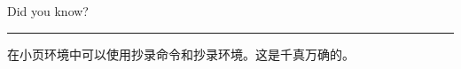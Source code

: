 \documentclass{book}
\begin{document}
\parbox{37mm}{Did you know?\par \rule[4mm]{37mm}{1.5pt}}

\framebox{\rule{9mm}{1pt}\rule{1pt}{5mm}}
\framebox{\rule{9mm}{0pt}\rule{0pt}{5mm}}

\noindent {}


\newsavebox{\mysquare}
\sbox{\mysquare}{\fboxrule=1pt \framebox{\rule{7mm}{0pt}\rule{0pt}{7mm}}}

\usebox{\mysquare}
\usebox{\mysquare}

\newsavebox{\mybox}
\newenvironment{FramePage}[2][c]%
{\begin{lrbox}{\mybox}\begin{minipage}[#1]{#2}}%
{\end{minipage}\end{lrbox}\shadowsize=2pt \shadowbox{\usebox{\mybox}}}
\begin{FramePage}{58mm}
在小页环境中可以使用抄录命令和抄录环境。这是千真万确的。
\end{FramePage}
\end{document}
